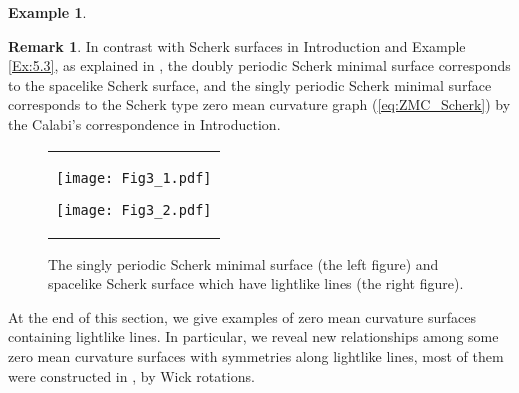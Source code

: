 \documentclass[12pt,amstex]{amsart}%
\theoremstyle{plain} %
\theoremstyle{definition}
\newtheorem{remark}[theorem]{Remark}
\newtheorem{example}[theorem]{Example}
\begin{document}
\begin{example}
\begin{remark}
In contrast with Scherk surfaces in Introduction and Example \ref{Ex:5.3}, as explained in \cite[Example 1]{Lee}, the doubly periodic Scherk minimal surface corresponds to the spacelike Scherk surface, and the singly periodic Scherk minimal surface corresponds to the Scherk type zero mean curvature graph (\ref{eq:ZMC_Scherk}) by the Calabi's correspondence in Introduction.
\end{remark}
\begin{figure}[!h]
\vspace{-0.3cm}
\begin{center}
\begin{tabular}{c}
\hspace{+0.1cm}
\begin{minipage}{0.4\hsize}
\begin{center}
\vspace{-0.8cm}
\texttt{[image: Fig3\_1.pdf]}
\vspace{0.5cm}
\end{center}
\end{minipage}
\hspace{0.5cm}
\begin{minipage}{0.4\hsize}
\begin{center}
\vspace{-1.0cm}
\texttt{[image: Fig3\_2.pdf]}
\vspace{0.3cm}
\end{center}
\end{minipage}

\end{tabular}
\end{center}
\vspace{-0.3cm}
\caption{The singly periodic Scherk minimal surface (the left figure) and spacelike Scherk surface which have lightlike lines (the right figure).}\label{Fig:5.3}

\end{figure}

\end{example}

At the end of this section, we give examples of zero mean curvature surfaces containing lightlike lines. In particular, we reveal new relationships among some zero mean curvature surfaces with symmetries along lightlike lines, most of them were constructed in \cite{FujimoriETAL1}, by Wick rotations.  
\end{document}

